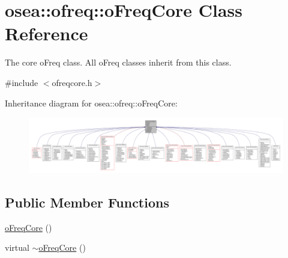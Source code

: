 \hypertarget{classosea_1_1ofreq_1_1o_freq_core}{\section{osea\-:\-:ofreq\-:\-:o\-Freq\-Core Class Reference}
\label{classosea_1_1ofreq_1_1o_freq_core}
}


The core o\-Freq class. All o\-Freq classes inherit from this class.  




{\ttfamily \#include $<$ofreqcore.\-h$>$}



Inheritance diagram for osea\-:\-:ofreq\-:\-:o\-Freq\-Core\-:
\nopagebreak
\begin{figure}[H]
\begin{center}
\leavevmode
\includegraphics[width=350pt]{classosea_1_1ofreq_1_1o_freq_core__inherit__graph}
\end{center}
\end{figure}
\subsection*{Public Member Functions}
\begin{DoxyCompactItemize}
\item 
\hyperlink{classosea_1_1ofreq_1_1o_freq_core_a5c882c0d8e78706270e377b749a647f5}{o\-Freq\-Core} ()
\item 
virtual \hyperlink{classosea_1_1ofreq_1_1o_freq_core_aea5887547dbd17fc2d4f1a99fe217918}{$\sim$o\-Freq\-Core} ()
\end{DoxyCompactItemize}
